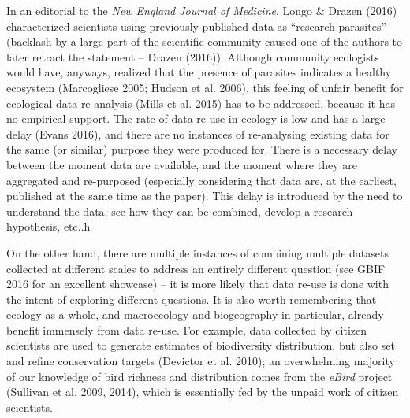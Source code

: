 \documentclass[12pt]{article}
\begin{document}
In an editorial to the \emph{New England Journal of Medicine}, Longo \&
Drazen (2016) characterized scientists using previously published data
as \enquote{research parasites} (backlash by a large part of the
scientific community caused one of the authors to later retract the
statement -- Drazen (2016)). Although community ecologists would have,
anyways, realized that the presence of parasites indicates a healthy
ecosystem (Marcogliese 2005; Hudson et al. 2006), this feeling of unfair
benefit for ecological data re-analysis (Mills et al. 2015) has to be
addressed, because it has no empirical support. The rate of data re-use
in ecology is low and has a large delay (Evans 2016), and there are no
instances of re-analysing existing data for the same (or similar)
purpose they were produced for. There is a necessary delay between the
moment data are available, and the moment where they are aggregated and
re-purposed (especially considering that data are, at the earliest,
published at the same time as the paper). This delay is introduced by
the need to understand the data, see how they can be combined, develop a
research hypothesis, etc..h

On the other hand, there are multiple instances of combining multiple
datasets collected at different scales to address an entirely different
question (see GBIF 2016 for an excellent showcase) -- it is more likely
that data re-use is done with the intent of exploring different
questions. It is also worth remembering that ecology as a whole, and
macroecology and biogeography in particular, already benefit immensely
from data re-use. For example, data collected by citizen scientists are
used to generate estimates of biodiversity distribution, but also set
and refine conservation targets (Devictor et al. 2010); an overwhelming
majority of our knowledge of bird richness and distribution comes from
the \emph{eBird} project (Sullivan et al. 2009, 2014), which is
essentially fed by the unpaid work of citizen scientists.
\end{document}
